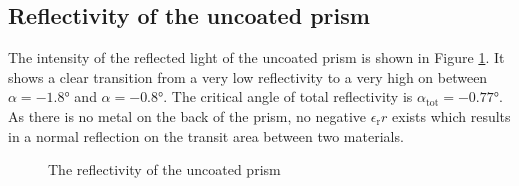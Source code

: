\documentclass[twoside,english,headsepline=on,DIV=11]{scrartcl}
\numberwithin{equation}{section}
\begin{document}
\subsection{Reflectivity of the uncoated prism}
The intensity of the reflected light of the uncoated prism is shown in Figure \ref{fig:uncoated}. It shows a clear transition from a very low reflectivity to a very high on between $\alpha = -1.8°$ and $\alpha = -0.8°$. The critical angle of total reflectivity is $\alpha_\text{tot} = -0.77°$. As there is no metal on the back of the prism, no negative $\epsilon_\text{r}r$ exists which results in a normal reflection on the transit area between two materials.
\begin{figure}
	
	\caption{The reflectivity of the uncoated prism}
	\label{fig:uncoated}
\end{figure}
\end{document}
